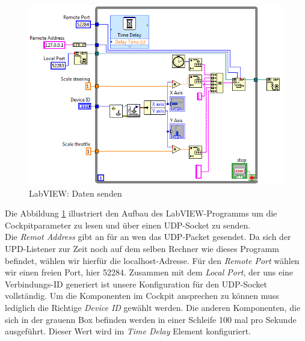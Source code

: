 \newpage 

\begin{figure}[H]
\centering 
\includegraphics[width=1\linewidth]{src/labview_screenshot_videoplayer_daten_senden.png}
\caption{LabVIEW: Daten senden} %
\label{labview_screenshot_videoplayer_daten_senden} %
\end{figure}
Die Abbildung \ref{labview_screenshot_videoplayer_daten_senden} illustriert den Aufbau des LabVIEW-Programms um die Cockpitparameter zu lesen und über einen UDP-Socket zu senden.\\
Die \textit{Remot Address} gibt an für an wen das UDP-Packet gesendet. Da sich der UPD-Listener zur Zeit noch auf dem selben Rechner wie dieses Programm befindet, wählen wir hierfür die localhost-Adresse. Für den \textit{Remote Port} wählen wir einen freien Port, hier 52284. Zusammen mit dem \textit{Local Port}, der uns eine Verbindungs-ID generiert ist unsere Konfiguration für den UDP-Socket vollständig. Um die Komponenten im Cockpit ansprechen zu können muss lediglich die Richtige \textit{Device ID} gewählt werden. Die anderen Komponenten, die sich in der grauenn Box befinden werden in einer Schleife 100 mal pro Sekunde ausgeführt. Dieser Wert wird im \textit{Time Delay} Element konfiguriert. \\
